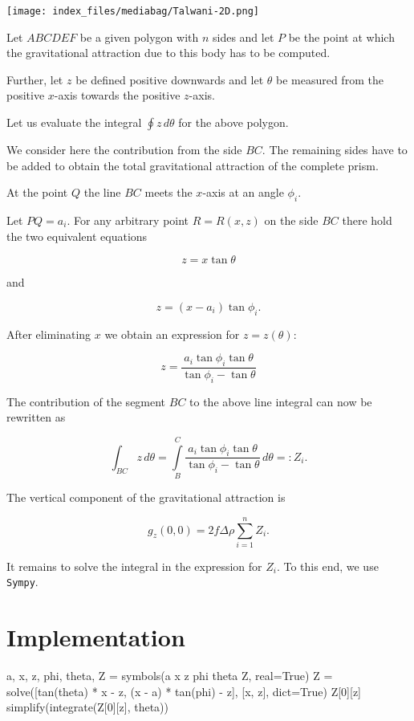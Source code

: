 \documentclass[
  a4paper,
  DIV=11,
  numbers=noendperiod]{scrreprt}
\newenvironment{Shaded}{\begin{snugshade}}{\end{snugshade}}
\newcommand{\BuiltInTok}[1]{\textcolor[rgb]{0.00,0.23,0.31}{#1}}
\newcommand{\DecValTok}[1]{\textcolor[rgb]{0.68,0.00,0.00}{#1}}
\newcommand{\NormalTok}[1]{\textcolor[rgb]{0.00,0.23,0.31}{#1}}
\newcommand{\OperatorTok}[1]{\textcolor[rgb]{0.37,0.37,0.37}{#1}}
\newcommand{\StringTok}[1]{\textcolor[rgb]{0.13,0.47,0.30}{#1}}
\newcommand{\VariableTok}[1]{\textcolor[rgb]{0.07,0.07,0.07}{#1}}
\begin{document}
\texttt{[image: index\_files/mediabag/Talwani-2D.png]}

Let \(ABCDEF\) be a given polygon with \(n\) sides and let \(P\) be the
point at which the gravitational attraction due to this body has to be
computed.

Further, let \(z\) be defined positive downwards and let \(\theta\) be
measured from the positive \(x\)-axis towards the positive \(z\)-axis.

Let us evaluate the integral \(\oint z\, d\theta\) for the above
polygon.

We consider here the contribution from the side \(BC\). The remaining
sides have to be added to obtain the total gravitational attraction of
the complete prism.

At the point \(Q\) the line \(BC\) meets the \(x\)-axis at an angle
\(\phi_i\).

Let \(PQ = a_i\). For any arbitrary point \(R = R(x,z)\) on the side
\(BC\) there hold the two equivalent equations

\[
z = x \tan\theta
\]

and

\[
z = (x - a_i) \tan\phi_i.
\]

After eliminating \(x\) we obtain an expression for \(z = z(\theta)\):

\[
z = \frac{a_i \tan\phi_i \tan\theta}{\tan\phi_i - \tan\theta}
\]

The contribution of the segment \(BC\) to the above line integral can
now be rewritten as

\[
\int_{BC} z \, d\theta = \int\limits_B^C \frac{a_i \tan\phi_i \tan\theta}{\tan\phi_i - \tan\theta} \, d\theta =: Z_i.
\]

The vertical component of the gravitational attraction is

\[
g_z(0, 0) = 2 f \Delta \rho \sum_{i=1}^n Z_i.
\]

It remains to solve the integral in the expression for \(Z_i\). To this
end, we use \texttt{Sympy}.

\section{Implementation}\label{implementation}

\begin{Shaded}
\begin{Highlighting}[]
\NormalTok{a, x, z, phi, theta, Z }\OperatorTok{=}\NormalTok{ symbols(}\StringTok{\textquotesingle{}a x z phi theta Z\textquotesingle{}}\NormalTok{, real}\OperatorTok{=}\VariableTok{True}\NormalTok{)}
\NormalTok{Z }\OperatorTok{=}\NormalTok{ solve([tan(theta) }\OperatorTok{*}\NormalTok{ x }\OperatorTok{{-}}\NormalTok{ z, (x }\OperatorTok{{-}}\NormalTok{ a) }\OperatorTok{*}\NormalTok{ tan(phi) }\OperatorTok{{-}}\NormalTok{ z], [x, z], }\BuiltInTok{dict}\OperatorTok{=}\VariableTok{True}\NormalTok{)}
\NormalTok{Z[}\DecValTok{0}\NormalTok{][z]}
\NormalTok{simplify(integrate(Z[}\DecValTok{0}\NormalTok{][z], theta))}
\end{Highlighting}
\end{Shaded}
\end{document}
